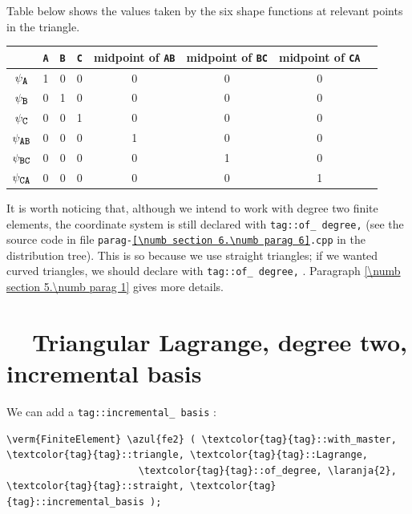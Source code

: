 Table below shows the values taken by the six shape functions at relevant points in the triangle.

\begin{center}\begin{tabular}{ | c | c | c | c | c | c | c | c | }
  \hline
  & {\small\tt A} & {\small\tt B} & {\small\tt C} & midpoint of {\small\tt AB} &
  midpoint of {\small\tt BC} & midpoint of {\small\tt CA}
  \\ \hline
  $ \psi_{\mbox{\small\tt A}} $ & 1 & 0 & 0 & 0 & 0 & 0
  \\ \hline
  $ \psi_{\mbox{\small\tt B}} $ & 0 & 1 & 0 & 0 & 0 & 0
  \\ \hline
  $ \psi_{\mbox{\small\tt C}} $ & 0 & 0 & 1 & 0 & 0 & 0
  \\ \hline
  $ \psi_{\mbox{\small\tt AB}} $ & 0 & 0 & 0 & 1 & 0 & 0
  \\ \hline
  $ \psi_{\mbox{\small\tt BC}} $ & 0 & 0 & 0 & 0 & 1 & 0
  \\ \hline
  $ \psi_{\mbox{\small\tt CA}} $ & 0 & 0 & 0 & 0 & 0 & 1
  \\ \hline
\end{tabular}\end{center}

It is worth noticing that, although we intend to work with degree two finite elements,
the coordinate system {\small\tt{}} is still declared with
{\small\tt\textcolor{tag}{tag}::of\_\,degree,} {\small\tt{}}
(see the source code in file {\small\tt parag-\ref{\numb section 6.\numb parag 6}.cpp}
in the distribution tree).
This is so because we use straight triangles; if we wanted curved triangles, we should
declare {\small\tt{}} with {\small\tt\textcolor{tag}{tag}::of\_\,degree,}
{\small\tt{}}.
Paragraph \ref{\numb section 5.\numb parag 1} gives more details.


\section{~~Triangular Lagrange, degree two, incremental basis}
\label{\numb section 6.\numb parag 7}

We can add a {\small\tt\textcolor{tag}{tag}::incremental\_\,basis} :

\begin{Verbatim}[commandchars=\\\{\},formatcom=\small\tt,frame=single,
   label=parag-\ref{\numb section 6.\numb parag 7}.cpp,rulecolor=\color{moldura},
   baselinestretch=0.94,framesep=2mm                                            ]
   \verm{FiniteElement} \azul{fe2} ( \textcolor{tag}{tag}::with_master, \textcolor{tag}{tag}::triangle, \textcolor{tag}{tag}::Lagrange,
                       \textcolor{tag}{tag}::of_degree, \laranja{2}, \textcolor{tag}{tag}::straight, \textcolor{tag}{tag}::incremental_basis );
\end{Verbatim}

